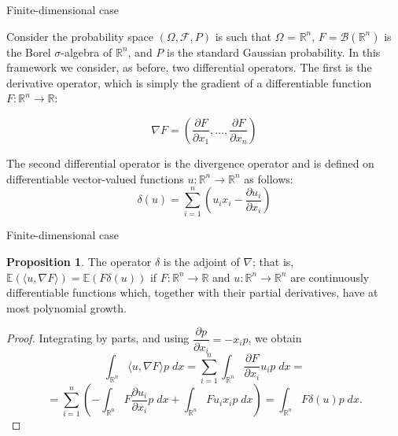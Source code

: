 \documentclass{beamer}%
\theoremstyle{definition}
\newtheorem{proposition}[theorem]{Proposition}
\begin{document}
\begin{frame}{Finite-dimensional case}

Consider the probability space $(\Omega, \mathcal{F}, P)$ is such that $\Omega$ = $\mathbb{R}^n$, $F = \mathcal{B}(\mathbb{R}^n)$ is the Borel $\sigma$-algebra of $\mathbb{R}^n$, and $P$ is the standard Gaussian probability. In this framework we consider, as before, two differential operators. The first is the derivative operator, which is simply the gradient of a differentiable function $F: \mathbb{R}^n \rightarrow \mathbb{R}$:

$$
\nabla F = \left(\dfrac{\partial F}{\partial x_1}, \ldots, \dfrac{\partial F}{\partial x_n}\right)
$$

The second differential operator is the divergence operator and is defined on differentiable
vector-valued functions $u: \mathbb{R}^n \rightarrow \mathbb{R}^n$ as follows: 
$$
\delta(u) = \sum_{i=1}^{n} \left(u_i x_i - \dfrac{\partial u_i}{\partial x_i}\right)
$$

\end{frame}


\begin{frame}{Finite-dimensional case}
\begin{proposition}
The operator $\delta$ is the adjoint of $\nabla$; that is, $\mathbb{E}(\langle u, \nabla F\rangle) = \mathbb{E}(F \delta(u))$
if $F: \mathbb{R}^n \rightarrow \mathbb{R}$ and $u: \mathbb{R}^n \rightarrow \mathbb{R}^n$ are continuously differentiable functions which, together with their partial derivatives, have at most polynomial growth.
\end{proposition}
\begin{proof}
Integrating by parts, and using $\dfrac{\partial p}{\partial x_i} = -x_ip$, we obtain
$$
\int_{\mathbb{R}^n} \langle u, \nabla F\rangle p\; dx = \sum_{i=1}^{n} \int_{\mathbb{R}^n} \dfrac{\partial F}{\partial x_i} u_i p\; dx = 
$$
$$
= \sum_{i=1}^{n} \left(-\int_{\mathbb{R}^n} F \dfrac{\partial u_i}{\partial x_i}p\; dx + \int_{\mathbb{R}^n} Fu_ix_ip\; dx \right) = \int_{\mathbb{R}^n} F \delta(u)p\; dx.
$$
\end{proof}

\end{frame}
\end{document}
